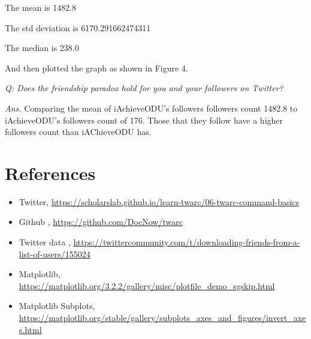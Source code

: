 \documentclass[12pt]{article}
\begin{document}
The mean is 1482.8

The std deviation is 6170.291662474311

The median is 238.0

And then plotted the graph as shown in Figure 4.


\emph{Q: Does the friendship paradox hold for you and your followers on Twitter?}

\emph{Ans.} Comparing the mean of iAchieveODU's  followers followers count 1482.8 to  iAchieveODU's  followers  count of 176. Those that they follow have a higher followers count than iAChieveODU has.

\section*{References}
\begin{itemize}
    \item {Twitter, \url{https://scholarslab.github.io/learn-twarc/06-twarc-command-basics}}
    \item {Github , \url{https://github.com/DocNow/twarc}}
    \item {Twitter data , \url{https://twittercommunity.com/t/downloading-friends-from-a-list-of-users/155024}}
    \item {Matplotlib,
    \url{https://matplotlib.org/3.2.2/gallery/misc/plotfile_demo_sgskip.html}}
   \item {Matplotlib Subplots,
    \url{https://matplotlib.org/stable/gallery/subplots_axes_and_figures/invert_axes.html}}
   
    
\end{itemize} 
\end{document}
